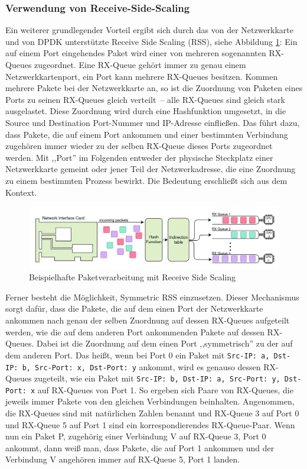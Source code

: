 \documentclass[../review_2.tex]{subfiles}
\begin{document}
\subsubsection{Verwendung von Receive-Side-Scaling}
Ein weiterer grundlegender Vorteil ergibt sich durch das von der Netzwerkkarte und von DPDK unterstützte Receive Side Scaling (RSS), siehe Abbildung \ref{fig:Receive-Side-Scaling}: Ein auf einem Port eingehendes Paket wird einer von mehreren sogenannten RX-Queues zugeordnet. Eine RX-Queue gehört immer zu genau einem Netzwerkkartenport, ein Port kann mehrere RX-Queues besitzen. Kommen mehrere Pakete bei der Netzwerkkarte an, so ist die Zuordnung von Paketen eines Ports zu seinen RX-Queues gleich verteilt~-- alle RX-Queues sind gleich stark ausgelastet. Diese Zuordnung wird durch eine Hashfunktion umgesetzt, in die Source und Destination Port-Nummer und IP-Adresse einfließen. Das führt dazu, dass Pakete, die auf einem Port ankommen und einer bestimmten Verbindung zugehören immer wieder zu der selben RX-Queue dieses Ports zugeordnet werden. Mit ,,Port'' im Folgenden entweder der physische Steckplatz einer Netzwerkkarte gemeint oder jener Teil der Netzwerkadresse, die eine Zuordnung zu einem bestimmten Prozess bewirkt. Die Bedeutung erschließt sich aus dem Kontext.

\begin{figure}[h]
    \centering
    \includegraphics[width=0.95\linewidth]{img/Receive-Side-Scaling.png}
    \caption{Beispielhafte Paketverarbeitung mit Receive Side Scaling}
    \label{fig:Receive-Side-Scaling}
\end{figure}

Ferner besteht die Möglichkeit, Symmetric RSS einzusetzen. Dieser Mechanismus sorgt dafür, dass die Pakete, die auf dem einen Port der Netzwerkkarte ankommen nach genau der selben Zuordnung auf dessen RX-Queues aufgeteilt werden, wie die auf dem anderen Port ankommenden Pakete auf dessen RX-Queues. Dabei ist die Zuordnung auf dem einen Port ,,symmetrisch'' zu der auf dem anderen Port. Das heißt, wenn bei Port 0 ein Paket mit \texttt{Src-IP: a, Dst-IP: b, Src-Port: x, Dst-Port: y} ankommt, wird es genauso dessen RX-Queues zugeteilt, wie ein Paket mit \texttt{Src-IP: b, Dst-IP: a, Src-Port: y, Dst-Port: x} auf RX-Queues von Port 1. So ergeben sich Paare von RX-Queues, die jeweils immer Pakete von den gleichen Verbindungen beinhalten. Angenommen, die RX-Queues sind mit natürlichen Zahlen benannt und RX-Queue 3 auf Port 0 und RX-Queue 5 auf Port 1 sind ein korrespondierendes RX-Queue-Paar. Wenn nun ein Paket P, zugehörig einer Verbindung V auf RX-Queue 3, Port 0 ankommt, dann weiß man, dass Pakete, die auf Port 1 ankommen und der Verbindung V angehören immer auf RX-Queue 5, Port 1 landen.
\end{document}
